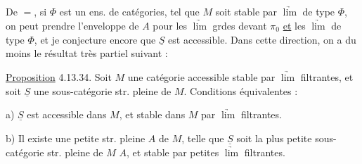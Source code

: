 De $=$, si $\Phi$ est un  ens. de  catégories,   tel que $M$ soit stable par $\underrightarrow{\lim}$ de type $\Phi$, on peut prendre l'enveloppe  de $A$ pour les $\underrightarrow{\lim}$ grdes devant $\pi_0$ \uline{et} les $\underrightarrow{\lim}$ de type $\Phi$, et je conjecture encore que $\underline S$ est accessible. Dans cette direction, on a du moins le résultat très partiel suivant :

\uline{Proposition} 4.13.34. Soit $M$ une catégorie accessible stable par  $\underrightarrow{\lim}$ filtrantes, et soit $\underline S$ une sous-catégorie str. pleine de $M$. Conditions équivalentes :

a) $\underline S$ est accessible dans $M$, et stable dans $M$ par  $\underrightarrow{\lim}$ filtrantes.

b) Il existe une petite   str. pleine $A$ de $M$, telle que $\underline S$ soit la plus petite sous-catégorie str. pleine de $M$  $A$, et stable par petites $\underrightarrow{\lim}$ filtrantes.
